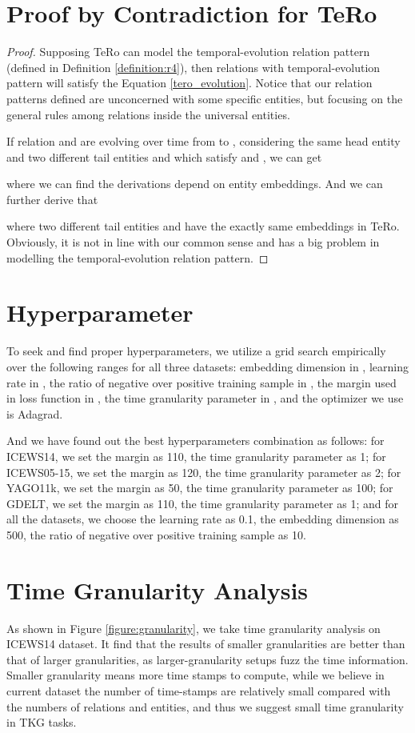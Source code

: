 \documentclass[11pt]{article}
\begin{document}
\section{Proof by Contradiction for TeRo}
\label{app:proof_tero}
\begin{proof}
Supposing TeRo \cite{xu2020tero} can model the temporal-evolution relation pattern (defined in Definition \ref{definition:r4}), then relations with temporal-evolution pattern will satisfy the Equation \ref{tero_evolution}.
Notice that our relation patterns defined are unconcerned with some specific entities, but focusing on the general rules among relations inside the universal entities.

If relation  and  are evolving over time from  to , considering the same head entity  and two different tail entities  and  which satisfy  and , we can get

where we can find the derivations depend on entity embeddings. And we can further derive that

where two different tail entities  and  have the exactly same embeddings in TeRo. Obviously, it is not in line with our common sense and has a big problem in modelling the temporal-evolution relation pattern.
\end{proof}


\section{Hyperparameter}
\label{app:hyperparameter}
To seek and find proper hyperparameters, we utilize a grid search empirically over the following ranges for all three datasets: embedding dimension in , learning rate in , the ratio of negative over positive training sample in , the margin used in loss function in ,  the time granularity parameter in , and the optimizer we use is Adagrad.

And we have found out the best hyperparameters combination as follows: for ICEWS14, we set the margin as 110, the time granularity parameter as 1; for ICEWS05-15, we set the margin as 120, the time granularity parameter as 2; for YAGO11k, we set the margin as 50, the time granularity parameter as 100; for GDELT, we set the margin as 110, the time granularity parameter as 1; and for all the datasets, we choose the learning rate as 0.1, the embedding dimension as 500, the ratio of negative over positive training sample as 10.


\section{Time Granularity Analysis}
\label{app:time_granularity}
As shown in Figure \ref{figure:granularity}, we take time granularity analysis on ICEWS14 dataset.
It find that the results of smaller granularities are better than that of larger granularities, as larger-granularity setups fuzz the time information.
Smaller granularity means more time stamps to compute, while we believe in current dataset the number of time-stamps are relatively small compared with the numbers of relations and entities, and thus we suggest small time granularity in TKG tasks.
\end{document}

